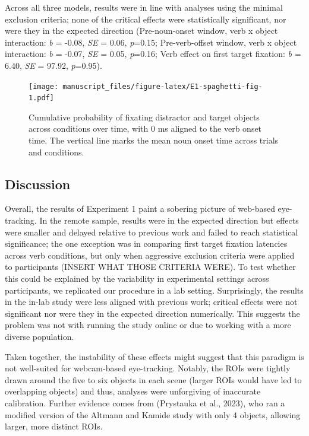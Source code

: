 \documentclass[
  man,floatsintext]{apa6}
\begin{document}
Across all three models, results were in line with analyses using the minimal exclusion criteria; none of the critical effects were statistically significant, nor were they in the expected direction (Pre-noun-onset window, verb x object interaction: \emph{b} = -0.08, \emph{SE} = 0.06, \emph{p}=0.15; Pre-verb-offset window, verb x object interaction: \emph{b} = -0.07, \emph{SE} = 0.05, \emph{p}=0.16; Verb effect on first target fixation: \emph{b} = 6.40, \emph{SE} = 97.92, \emph{p}=0.95).

\begin{figure}
\centering
\texttt{[image: manuscript\_files/figure-latex/E1-spaghetti-fig-1.pdf]}
\caption{\label{fig:E1-spaghetti-fig}Cumulative probability of fixating distractor and target objects across conditions over time, with 0 ms aligned to the verb onset time. The vertical line marks the mean noun onset time across trials and conditions.}
\end{figure}

\subsection{Discussion}\label{discussion}

Overall, the results of Experiment 1 paint a sobering picture of web-based eye-tracking. In the remote sample, results were in the expected direction but effects were smaller and delayed relative to previous work and failed to reach statistical significance; the one exception was in comparing first target fixation latencies across verb conditions, but only when aggressive exclusion criteria were applied to participants (INSERT WHAT THOSE CRITERIA WERE). To test whether this could be explained by the variability in experimental settings across participants, we replicated our procedure in a lab setting. Surprisingly, the results in the in-lab study were less aligned with previous work; critical effects were not significant nor were they in the expected direction numerically. This suggests the problem was not with running the study online or due to working with a more diverse population.

Taken together, the instability of these effects might suggest that this paradigm is not well-suited for webcam-based eye-tracking. Notably, the ROIs were tightly drawn around the five to six objects in each scene (larger ROIs would have led to overlapping objects) and thus, analyses were unforgiving of inaccurate calibration. Further evidence comes from (Prystauka et al., 2023), who ran a modified version of the Altmann and Kamide study with only 4 objects, allowing larger, more distinct ROIs.
\end{document}
